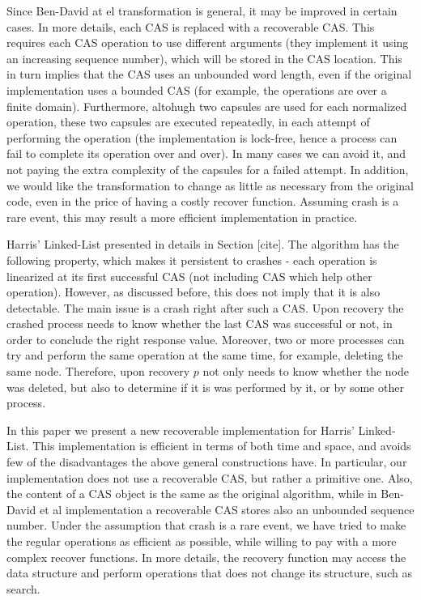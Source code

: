 Since Ben-David at el transformation is general, it may be improved in certain cases. In more details, each CAS is replaced with a recoverable CAS. This requires each CAS operation to use different arguments (they implement it using an increasing sequence number), which will be stored in the CAS location. This in turn implies that the CAS uses an unbounded word length, even if the original implementation uses a bounded CAS (for example, the operations are over a finite domain). Furthermore, altohugh two capsules are used for each normalized operation, these two capsules are executed repeatedly, in each attempt of performing the operation (the implementation is lock-free, hence a process can fail to complete its operation over and over). In many cases we can avoid it, and not paying the extra complexity of the capsules for a failed attempt.
In addition, we would like the transformation to change as little as necessary from the original code, even in the price of having a costly recover function. Assuming crash is a rare event, this may result a more efficient implementation in practice.

Harris' Linked-List presented in details in Section [cite]. The algorithm has the following property, which makes it persistent to crashes - each operation is linearized at its first successful CAS (not including CAS which help other operation). However, as discussed before, this does not imply that it is also detectable. The main issue is a crash right after such a CAS. Upon recovery the crashed process needs to know whether the last CAS was successful or not, in order to conclude the right response value. Moreover, two or more processes can try and perform the same operation at the same time, for example, deleting the same node. Therefore, upon recovery $p$ not only needs to know whether the node was deleted, but also to determine if it is was performed by it, or by some other process.






In this paper we present a new recoverable implementation for Harris' Linked-List. This implementation is efficient in terms of both time and space, and avoids few of the disadvantages the above general constructions have. In particular, our implementation does not use a recoverable CAS, but rather a primitive one. Also, the content of a CAS object is the same as the original algorithm, while in Ben-David et al implementation a recoverable CAS stores also an unbounded sequence number. Under the assumption that crash is a rare event, we have tried to make the regular operations as efficient as possible, while willing to pay with a more complex recover functions. In more details, the recovery function may access the data structure and perform operations that does not change its structure, such as search.

